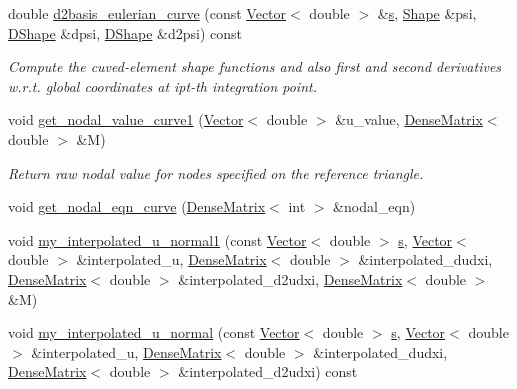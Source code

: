 \begin{DoxyCompactItemize}
double \hyperlink{classoomph_1_1C1CurvedElementBase_aca6c4b025f8368574a277266d3b9ae14}{d2basis\+\_\+eulerian\+\_\+curve} (const \hyperlink{classoomph_1_1Vector}{Vector}$<$ double $>$ \&\hyperlink{cfortran_8h_ab7123126e4885ef647dd9c6e3807a21c}{s}, \hyperlink{classoomph_1_1Shape}{Shape} \&psi, \hyperlink{classoomph_1_1DShape}{D\+Shape} \&dpsi, \hyperlink{classoomph_1_1DShape}{D\+Shape} \&d2psi) const
\begin{DoxyCompactList}\small\item\em Compute the cuved-\/element shape functions and also first and second derivatives w.\+r.\+t. global coordinates at ipt-\/th integration point. \end{DoxyCompactList}\item 
void \hyperlink{classoomph_1_1C1CurvedElementBase_ab7e659908f8da866873b8b0a46519c61}{get\+\_\+nodal\+\_\+value\+\_\+curve1} (\hyperlink{classoomph_1_1Vector}{Vector}$<$ double $>$ \&u\+\_\+value, \hyperlink{classoomph_1_1DenseMatrix}{Dense\+Matrix}$<$ double $>$ \&M)
\begin{DoxyCompactList}\small\item\em Return raw nodal value for nodes specified on the reference triangle. \end{DoxyCompactList}\item 
void \hyperlink{classoomph_1_1C1CurvedElementBase_aee42a8d77efc26f00b8d13337f9fb4f4}{get\+\_\+nodal\+\_\+eqn\+\_\+curve} (\hyperlink{classoomph_1_1DenseMatrix}{Dense\+Matrix}$<$ int $>$ \&nodal\+\_\+eqn)
\item 
void \hyperlink{classoomph_1_1C1CurvedElementBase_a909d924bec591390020dbcfe5c0d3e0e}{my\+\_\+interpolated\+\_\+u\+\_\+normal1} (const \hyperlink{classoomph_1_1Vector}{Vector}$<$ double $>$ \hyperlink{cfortran_8h_ab7123126e4885ef647dd9c6e3807a21c}{s}, \hyperlink{classoomph_1_1Vector}{Vector}$<$ double $>$ \&interpolated\+\_\+u, \hyperlink{classoomph_1_1DenseMatrix}{Dense\+Matrix}$<$ double $>$ \&interpolated\+\_\+dudxi, \hyperlink{classoomph_1_1DenseMatrix}{Dense\+Matrix}$<$ double $>$ \&interpolated\+\_\+d2udxi, \hyperlink{classoomph_1_1DenseMatrix}{Dense\+Matrix}$<$ double $>$ \&M)
\item 
void \hyperlink{classoomph_1_1C1CurvedElementBase_af66c0d5584a7789b4fe63316331dc50d}{my\+\_\+interpolated\+\_\+u\+\_\+normal} (const \hyperlink{classoomph_1_1Vector}{Vector}$<$ double $>$ \hyperlink{cfortran_8h_ab7123126e4885ef647dd9c6e3807a21c}{s}, \hyperlink{classoomph_1_1Vector}{Vector}$<$ double $>$ \&interpolated\+\_\+u, \hyperlink{classoomph_1_1DenseMatrix}{Dense\+Matrix}$<$ double $>$ \&interpolated\+\_\+dudxi, \hyperlink{classoomph_1_1DenseMatrix}{Dense\+Matrix}$<$ double $>$ \&interpolated\+\_\+d2udxi) const

\end{DoxyCompactItemize}
